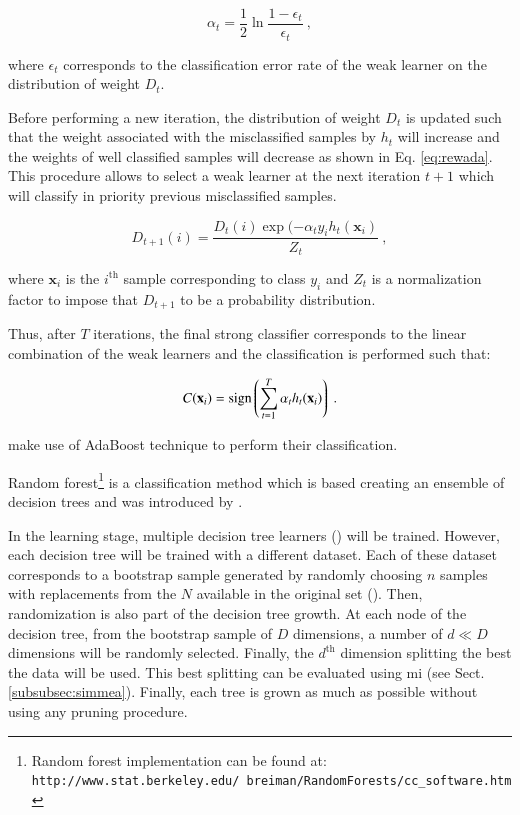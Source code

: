 \begin{enumerate}[leftmargin=*]
\begin{equation}
	\alpha_t = \frac{1}{2} \ln \frac{1 - \epsilon_t}{\epsilon_t} \ ,
	\label{eq:wclssada}
\end{equation}

\noindent where $\epsilon_t$ corresponds to the classification error rate of the weak learner on the distribution of weight $D_t$.

Before performing a new iteration, the distribution of weight $D_t$ is updated such that the weight associated with the misclassified samples by $h_t$ will increase and the weights of well classified samples will decrease as shown in Eq. \eqref{eq:rewada}. This procedure allows to select a weak learner at the next iteration $t+1$ which will classify in priority previous misclassified samples.

\begin{equation}
	D_{t+1}(i) = \frac{ D_t(i) \exp(-\alpha_t y_i h_{t}(\mathbf{x}_{i} ) }{ Z_t  } \ ,
	\label{eq:rewada} 
\end{equation}

\noindent where $\mathbf{x}_i$ is the $i^{\text{th}}$ sample corresponding to class $y_i$ and $Z_t$ is a normalization factor to impose that $D_{t+1}$ to be a probability distribution.

Thus, after $T$ iterations, the final strong classifier corresponds to the linear combination of the weak learners and the classification is performed such that:

\begin{equation}
	C(\mathbf{x}_i) = \operatorname*{sign} \left( \sum_{t=1}^{T} \alpha_t h_t(\mathbf{x}_i) \right) \ .
	\label{eq:strclaada}
\end{equation}

\cite{Lopes2011} make use of AdaBoost technique to perform their classification.

Random forest\footnote{Random forest implementation can be found at: \texttt{http://www.stat.\allowbreak berkeley.edu/~breiman/RandomForests/cc\_software.htm}} is a classification method which is based creating an ensemble of decision trees and was introduced by \cite{Breiman2001}.

In the learning stage, multiple decision tree learners (\cite{Breiman1984}) will be trained. However, each decision tree will be trained with a different dataset. Each of these dataset corresponds to a bootstrap sample generated by randomly choosing $n$ samples with replacements from the $N$ available in the original set (\cite{Efron1979}). Then, randomization is also part of the decision tree growth. At each node of the decision tree, from the bootstrap sample of $D$ dimensions, a number of $d \ll D$ dimensions will be randomly selected. Finally, the $d^{\text{th}}$ dimension splitting the best the data will be used. This best splitting can be evaluated using \ac{mi} (see Sect. \ref{subsubsec:simmea}). Finally, each tree is grown as much as possible without using any pruning procedure.


\end{enumerate}
